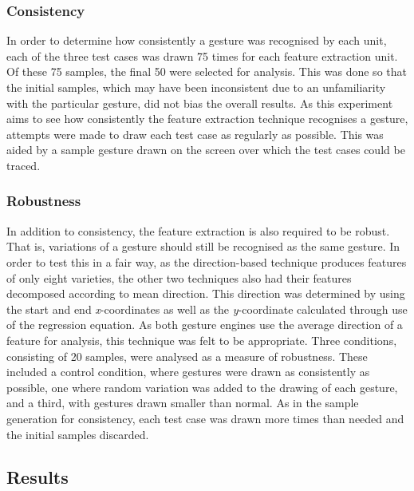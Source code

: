 \subsubsection{Consistency}
In order to determine how consistently a gesture was recognised by each unit, each of the three test cases was drawn 75 times for each feature extraction unit. Of these 75 samples, the final 50 were selected for analysis. This was done so that the initial samples, which may have been inconsistent due to an unfamiliarity with the particular gesture, did not bias the overall results. As this experiment aims to see how consistently the feature extraction technique recognises a gesture, attempts were made to draw each test case as regularly as possible. This was aided by a sample gesture drawn on the screen over which the test cases could be traced. 

\subsubsection{Robustness}
In addition to consistency, the feature extraction is also required to be robust. That is, variations of a gesture should still be recognised as the same gesture. In order to test this in a fair way, as the direction-based technique produces features of only eight varieties, the other two techniques also had their features decomposed according to mean direction. This direction was determined by using the start and end \emph{x}-coordinates as well as the \emph{y}-coordinate calculated through use of the regression equation. As both gesture engines use the average direction of a feature for analysis, this technique was felt to be appropriate. Three conditions, consisting of 20 samples, were analysed as a measure of robustness. These included a control condition, where gestures were drawn as consistently as possible, one where random variation was added to the drawing of each gesture, and a third, with gestures drawn smaller than normal. As in the sample generation for consistency, each test case was drawn more times than needed and the initial samples discarded.

\subsection{Results}
